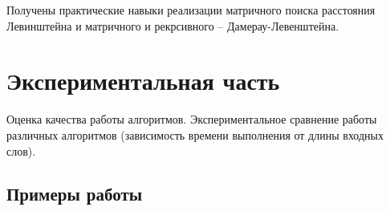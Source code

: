 \documentclass[a4paper,14pt]{article} %
\begin{document}
        Получены практические навыки реализации матричного поиска расстояния Левинштейна и матричного и рекрсивного -- Дамерау-Левенштейна. 

    \newpage

        \section{Экспериментальная часть}
        \hfill
        
        Оценка качества работы алгоритмов. Экспериментальное сравнение работы различных алгоритмов (зависимость времени выполнения от длины входных слов). 
        
        \subsection{Примеры работы}
	\hfill
	
\end{document}

